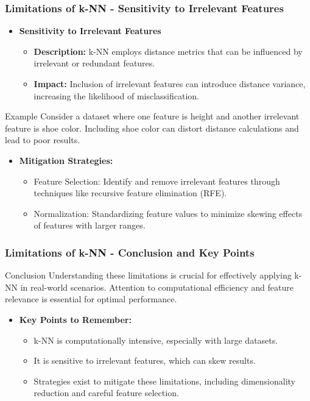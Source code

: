 \documentclass[aspectratio=169]{beamer}
\begin{document}
\begin{frame}[fragile]
    \frametitle{Limitations of k-NN - Sensitivity to Irrelevant Features}
    \begin{itemize}
        \item \textbf{Sensitivity to Irrelevant Features}
        \begin{itemize}
            \item \textbf{Description:} k-NN employs distance metrics that can be influenced by irrelevant or redundant features.
            \item \textbf{Impact:} Inclusion of irrelevant features can introduce distance variance, increasing the likelihood of misclassification.
        \end{itemize}
    \end{itemize}
    \begin{block}{Example}
        Consider a dataset where one feature is height and another irrelevant feature is shoe color. Including shoe color can distort distance calculations and lead to poor results.
    \end{block}
    \begin{itemize}
        \item \textbf{Mitigation Strategies:}
        \begin{itemize}
            \item Feature Selection: Identify and remove irrelevant features through techniques like recursive feature elimination (RFE).
            \item Normalization: Standardizing feature values to minimize skewing effects of features with larger ranges.
        \end{itemize}
    \end{itemize}
\end{frame}

\begin{frame}[fragile]
    \frametitle{Limitations of k-NN - Conclusion and Key Points}
    \begin{block}{Conclusion}
        Understanding these limitations is crucial for effectively applying k-NN in real-world scenarios. Attention to computational efficiency and feature relevance is essential for optimal performance.
    \end{block}
    \begin{itemize}
        \item \textbf{Key Points to Remember:}
        \begin{itemize}
            \item k-NN is computationally intensive, especially with large datasets.
            \item It is sensitive to irrelevant features, which can skew results.
            \item Strategies exist to mitigate these limitations, including dimensionality reduction and careful feature selection.
        \end{itemize}
    \end{itemize}
\end{frame}
\end{document}

